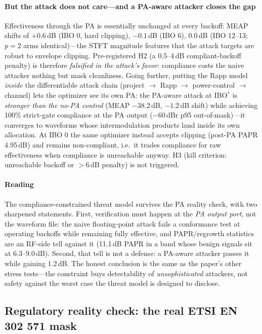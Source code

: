 \documentclass[review]{elsarticle}
\begin{document}
\paragraph{But the attack does not care---and a PA-aware attacker closes
the gap} Effectiveness through the PA is essentially unchanged at every
backoff: MEAP shifts of $+0.6$\,dB (IBO 0, hard clipping), $-0.1$\,dB
(IBO 6), $0.0$\,dB (IBO 12--13; $p{=}2$ arms identical)---the STFT
magnitude features that the attack targets are robust to envelope
clipping. Pre-registered H2 (a 0.5--4\,dB compliant-backoff penalty) is
therefore \emph{falsified in the attack's favor}: compliance costs the
naive attacker nothing but mask cleanliness. Going further, putting the
Rapp model \emph{inside} the differentiable attack chain
(project $\rightarrow$ Rapp $\rightarrow$ power-control $\rightarrow$
channel) lets the optimizer see its own PA: the PA-aware attack at
IBO$^{*}$ is \emph{stronger than the no-PA control} (MEAP $-38.2$\,dB,
$-1.2$\,dB shift) while achieving 100\% strict-gate compliance at the PA
output ($-60$\,dBr p95 out-of-mask)---it converges to waveforms whose
intermodulation products land inside its own allocation. At IBO 0 the
same optimizer instead accepts clipping (post-PA PAPR 4.95\,dB) and
remains non-compliant, i.e.\ it trades compliance for raw effectiveness
when compliance is unreachable anyway. H3 (kill criterion: unreachable
backoff or $>$6\,dB penalty) is not triggered.

\paragraph{Reading} The compliance-constrained threat model survives the
PA reality check, with two sharpened statements. First, verification
must happen at the \emph{PA output port}, not the waveform file: the
naive floating-point attack fails a conformance test at operating
backoffs while remaining fully effective, and PAPR/regrowth statistics
are an RF-side tell against it (11.1\,dB PAPR in a band whose benign
signals sit at 6.3--9.0\,dB). Second, that tell is not a defense: a
PA-aware attacker passes it while gaining 1.2\,dB. The honest conclusion
is the same as the paper's other stress tests---the constraint buys
detectability of \emph{unsophisticated} attackers, not safety against
the worst case the threat model is designed to disclose.

\subsection{Regulatory reality check: the real ETSI EN 302 571 mask}
\label{sec:etsimask}
\end{document}
